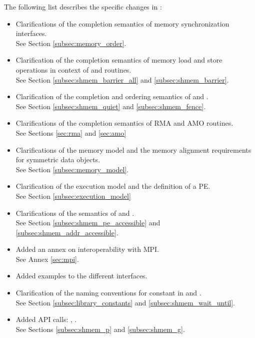 The following list describes the specific changes in \openshmem[1.1]:
\begin{itemize}
%
\item Clarifications of the completion semantics of memory synchronization 
      interfaces.
\\See Section \ref{subsec:memory_order}.
%
\item Clarification of the completion semantics of memory load and store
      operations in context of  and 
      routines.
\\See Section \ref{subsec:shmem_barrier_all} and \ref{subsec:shmem_barrier}.
%
\item Clarification of the completion and ordering semantics of
       and .
\\See Section \ref{subsec:shmem_quiet} and \ref{subsec:shmem_fence}.
%
\item Clarifications of the completion semantics of \ac{RMA} and \ac{AMO}
      routines.
\\See Sections \ref{sec:rma} and \ref{sec:amo}
%
\item Clarifications of the memory model and the memory alignment requirements
      for symmetric data objects.
\\See Section \ref{subsec:memory_model}.
%
\item Clarification of the execution model and the definition of a \ac{PE}.
\\See Section \ref{subsec:execution_model}
%
\item Clarifications of the semantics of  and
      .
\\See Section \ref{subsec:shmem_pe_accessible} and \ref{subsec:shmem_addr_accessible}.
%
\item Added an annex on interoperability with \ac{MPI}.
\\See Annex \ref{sec:mpi}.
%
\item Added examples to the different interfaces.
%
\item Clarification of the naming conventions for constant in \Cstd and
      \Fortran.
\\See Section \ref{subsec:library_constants} and \ref{subsec:shmem_wait_until}.
%
\item Added \ac{API} calls: , .
\\See Sections \ref{subsec:shmem_p} and \ref{subsec:shmem_g}. 

\end{itemize}
